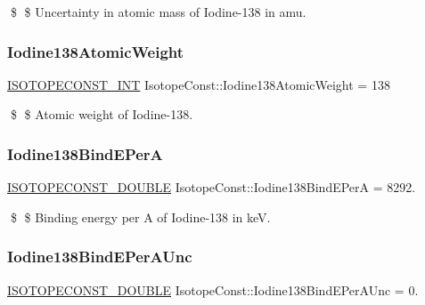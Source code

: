 \$ \$ Uncertainty in atomic mass of Iodine-\/138 in amu. \mbox{\label{group___isotope_const-_iodine-_i138_gada3517ba250e050de1cb9f0536605424}} 
\subsubsection{\texorpdfstring{Iodine138\+Atomic\+Weight}{Iodine138AtomicWeight}}
{\footnotesize\ttfamily \mbox{\hyperlink{group___isotope_const-_macros_ga5f18360b3e99483a35c32d789e62621c}{I\+S\+O\+T\+O\+P\+E\+C\+O\+N\+S\+T\+\_\+\+I\+NT}} Isotope\+Const\+::\+Iodine138\+Atomic\+Weight = 138}

\$ \$ Atomic weight of Iodine-\/138. \mbox{\label{group___isotope_const-_iodine-_i138_ga1bc497905b778b8abbf214b70837a592}} 
\subsubsection{\texorpdfstring{Iodine138\+Bind\+E\+PerA}{Iodine138BindEPerA}}
{\footnotesize\ttfamily \mbox{\hyperlink{group___isotope_const-_macros_ga8f45a7272ce02c0b4c65c44636ed719a}{I\+S\+O\+T\+O\+P\+E\+C\+O\+N\+S\+T\+\_\+\+D\+O\+U\+B\+LE}} Isotope\+Const\+::\+Iodine138\+Bind\+E\+PerA = 8292.}

\$ \$ Binding energy per A of Iodine-\/138 in keV. \mbox{\label{group___isotope_const-_iodine-_i138_gaa8a0286e7ac0e45f3e6ff5948638eb86}} 
\subsubsection{\texorpdfstring{Iodine138\+Bind\+E\+Per\+A\+Unc}{Iodine138BindEPerAUnc}}
{\footnotesize\ttfamily \mbox{\hyperlink{group___isotope_const-_macros_ga8f45a7272ce02c0b4c65c44636ed719a}{I\+S\+O\+T\+O\+P\+E\+C\+O\+N\+S\+T\+\_\+\+D\+O\+U\+B\+LE}} Isotope\+Const\+::\+Iodine138\+Bind\+E\+Per\+A\+Unc = 0.}

